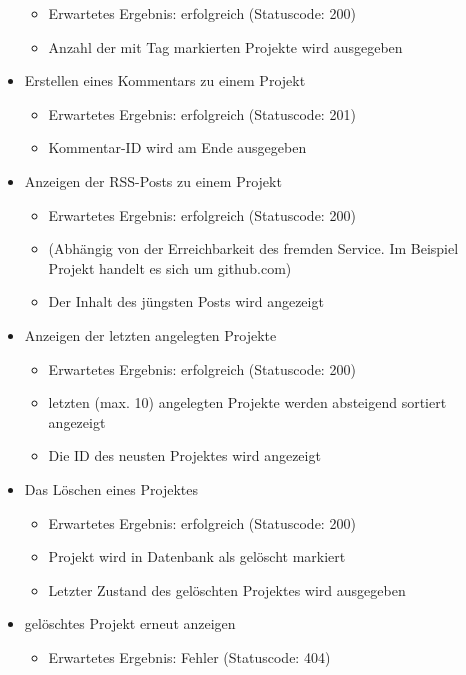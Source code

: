 \documentclass[12pt]{scrartcl}
\begin{document}
\begin{itemize}
\begin{itemize}
					\item Erwartetes Ergebnis: erfolgreich (Statuscode: 200)
					\item Anzahl der mit Tag markierten Projekte wird ausgegeben
				\end{itemize}
				\item Erstellen eines Kommentars zu einem Projekt
				\begin{itemize}
					\item Erwartetes Ergebnis: erfolgreich (Statuscode: 201)
					\item Kommentar-ID wird am Ende ausgegeben
				\end{itemize}
				\item Anzeigen der RSS-Posts zu einem Projekt
				\begin{itemize}
					\item Erwartetes Ergebnis: erfolgreich (Statuscode: 200)
					\item (Abhängig von der Erreichbarkeit des fremden Service. Im Beispiel Projekt handelt es sich um github.com)
					\item Der Inhalt des jüngsten Posts wird angezeigt
				\end{itemize}
				\item Anzeigen der letzten angelegten Projekte
				\begin{itemize}
					\item Erwartetes Ergebnis: erfolgreich (Statuscode: 200)
					\item letzten (max. 10) angelegten Projekte werden absteigend sortiert angezeigt
					\item Die ID des neusten Projektes wird angezeigt
				\end{itemize}
				\item Das Löschen eines Projektes
				\begin{itemize}
					\item Erwartetes Ergebnis: erfolgreich (Statuscode: 200)
					\item Projekt wird in Datenbank als gelöscht markiert
					\item Letzter Zustand des gelöschten Projektes wird ausgegeben
				\end{itemize}
				\item gelöschtes Projekt erneut anzeigen
				\begin{itemize}
					\item Erwartetes Ergebnis: Fehler (Statuscode: 404)
				\end{itemize}
			\end{itemize}
		
\end{document}
